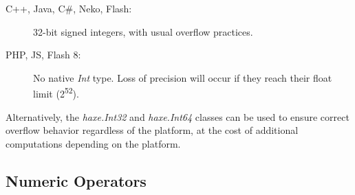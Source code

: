 \begin{description}
 \item[C++, Java, C\#, Neko, Flash:] 32-bit signed integers, with usual overflow practices. 
 \item[PHP, JS, Flash 8:] No native \emph{Int} type.  Loss of precision will occur if they reach their float limit (2\textsuperscript{52}).
\end{description}

Alternatively, the \emph{haxe.Int32} and \emph{haxe.Int64} classes can be used to ensure correct overflow behavior regardless of the platform, at the cost of additional computations depending on the platform.

\subsection{Numeric Operators}
\label{types-numeric-operators}


